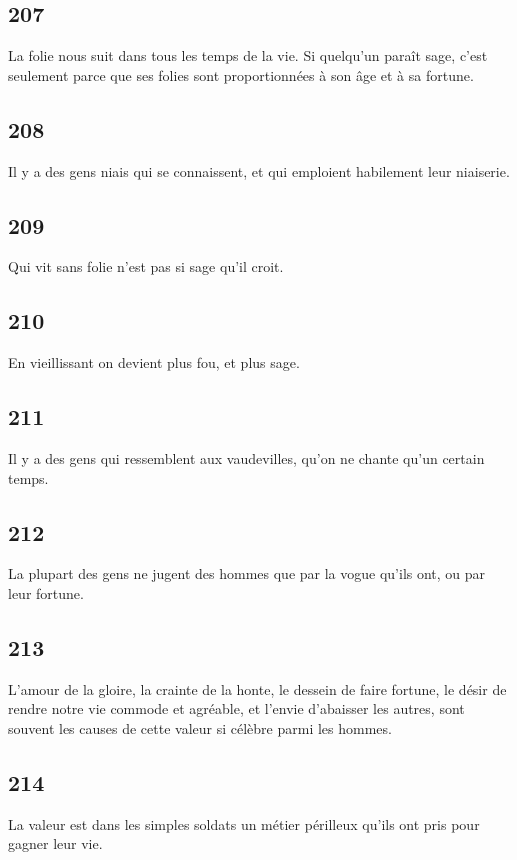 \documentclass[french,twoside]{book} %
\begin{document}
\subsection[{207}]{ \textsc{207} }
\noindent La folie nous suit dans tous les temps de la vie. Si quelqu’un paraît sage, c’est seulement parce que ses folies sont proportionnées à son âge et à sa fortune.
\subsection[{208}]{ \textsc{208} }
\noindent Il y a des gens niais qui se connaissent, et qui emploient habilement leur niaiserie.
\subsection[{209}]{ \textsc{209} }
\noindent Qui vit sans folie n’est pas si sage qu’il croit.
\subsection[{210}]{ \textsc{210} }
\noindent En vieillissant on devient plus fou, et plus sage.
\subsection[{211}]{ \textsc{211} }
\noindent Il y a des gens qui ressemblent aux vaudevilles, qu’on ne chante qu’un certain temps.
\subsection[{212}]{ \textsc{212} }
\noindent La plupart des gens ne jugent des hommes que par la vogue qu’ils ont, ou par leur fortune.
\subsection[{213}]{ \textsc{213} }
\noindent L’amour de la gloire, la crainte de la honte, le dessein de faire fortune, le désir de rendre notre vie commode et agréable, et l’envie d’abaisser les autres, sont souvent les causes de cette valeur si célèbre parmi les hommes.
\subsection[{214}]{ \textsc{214} }
\noindent La valeur est dans les simples soldats un métier périlleux qu’ils ont pris pour gagner leur vie.
\end{document}
